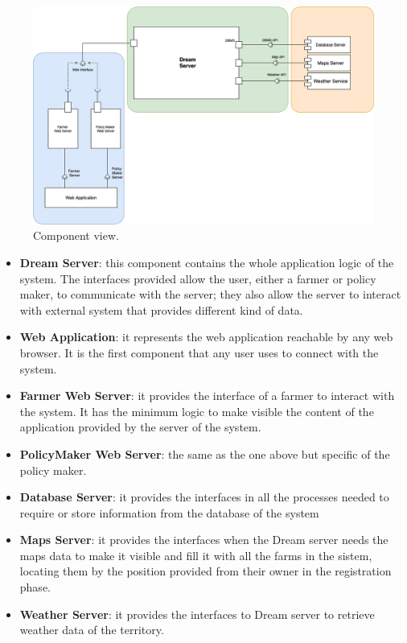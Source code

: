 \begin{figure}[H]
    \begin{center}
    \includegraphics[width=1\textwidth]{images/Component3.png}
    \caption{Component view.}
    \label{fig:component view2}
    \end{center}
\end{figure}

\begin{itemize}
    \item \textbf{Dream Server}: this component contains the whole application logic of the system. The interfaces provided allow the user, either a farmer or policy maker, to communicate with the server; they also allow the server to interact with external system that provides different kind of data.
    \item \textbf{Web Application}: it represents the web application reachable by any web browser. It is the first component that any user uses to connect with the system.
    \item \textbf{Farmer Web Server}: it provides the interface of a farmer to interact with the system. It has the minimum logic to make visible the content of the application provided by the server of the system. 
    \item \textbf{PolicyMaker Web Server}: the same as the one above but specific of the policy maker.
    \item \textbf{Database Server}: it provides the interfaces in all the processes needed to require or store information from the database of the system
    \item \textbf{Maps Server}: it provides the interfaces when the Dream server needs the maps data to make it visible and fill it with all the farms in the sistem, locating them by the position provided from their owner in the registration phase.
    \item \textbf{Weather Server}: it provides the interfaces to Dream server to retrieve weather data of the territory.
\end{itemize}

